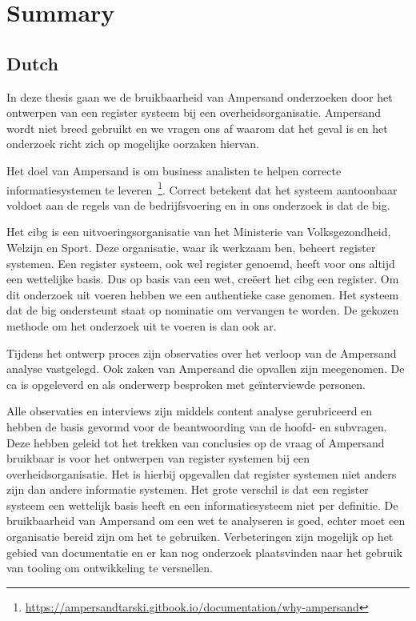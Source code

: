 \newpage
\section*{Summary} \label{Summary}
\subsection*{Dutch}

In deze thesis gaan we de bruikbaarheid van Ampersand onderzoeken door het ontwerpen van een register systeem bij een overheidsorganisatie.
Ampersand wordt niet breed gebruikt en we vragen ons af waarom dat het geval is en het onderzoek richt zich op mogelijke oorzaken hiervan.

Het doel van Ampersand is om business analisten te helpen correcte informatiesystemen te leveren~\footnote{\url{https://ampersandtarski.gitbook.io/documentation/why-ampersand}}. 
Correct betekent dat het systeem aantoonbaar voldoet aan de regels van de bedrijfsvoering en in ons onderzoek is dat de \acrshort{big}.

Het \acrshort{cibg} is een uitvoeringsorganisatie van het Ministerie van Volksgezondheid, Welzijn en Sport. 
Deze organisatie, waar ik werkzaam ben, beheert register systemen.
Een register systeem, ook wel register genoemd, heeft voor ons altijd een wettelijke basis. 
Dus op basis van een wet, creëert het \acrshort{cibg} een register.
Om dit onderzoek uit voeren hebben we een authentieke case genomen.
Het systeem dat de \acrshort{big} ondersteunt staat op nominatie om vervangen te worden.
De gekozen methode om het onderzoek uit te voeren is dan ook \acrshort{ar}.

Tijdens het ontwerp proces zijn observaties over het verloop van de Ampersand analyse vastgelegd. 
Ook zaken van Ampersand die opvallen zijn meegenomen.
De \acrlong{ca} is opgeleverd en als onderwerp besproken met geïnterviewde personen.

Alle observaties en interviews zijn middels content analyse gerubriceerd en hebben de basis gevormd voor de beantwoording van de hoofd- en subvragen. 
Deze hebben geleid tot het trekken van conclusies op de vraag of Ampersand bruikbaar is voor het ontwerpen van register systemen bij een overheidsorganisatie.
Het is hierbij opgevallen dat register systemen niet anders zijn dan andere informatie systemen.
Het grote verschil is dat een register systeem een wettelijk basis heeft en een informatiesysteem niet per definitie.
De bruikbaarheid van Ampersand om een wet te analyseren is goed, echter moet een organisatie bereid zijn om het te gebruiken. 
Verbeteringen zijn mogelijk op het gebied van documentatie en er kan nog onderzoek plaatsvinden naar het gebruik van tooling om ontwikkeling te versnellen. 


